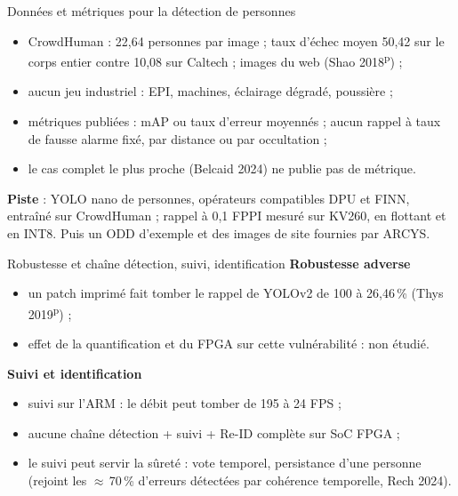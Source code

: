 \documentclass[aspectratio=169,11pt]{beamer}
\newcommand{\pre}{\textsuperscript{\color{acc}p}}
\begin{document}
\begin{frame}{Données et métriques pour la détection de personnes}
  \begin{itemize}
    \item CrowdHuman : 22,64 personnes par image ; taux d'échec moyen 50,42 sur le corps
          entier contre 10,08 sur Caltech ; images du web (Shao 2018\pre) ;
    \item \alert{aucun jeu industriel} : EPI, machines, éclairage dégradé, poussière ;
    \item métriques publiées : mAP ou taux d'erreur moyennés ; aucun rappel à taux de fausse
          alarme fixé, par distance ou par occultation ;
    \item le cas complet le plus proche (Belcaid 2024) ne publie pas de métrique.
  \end{itemize}

  \vspace{0.6em}
  \textbf{Piste} : YOLO nano de personnes, opérateurs compatibles DPU et FINN, entraîné sur
  CrowdHuman ; \alert{rappel à 0,1 FPPI} mesuré sur KV260, en flottant et en INT8. Puis un
  ODD d'exemple et des images de site fournies par ARCYS.
\end{frame}

\begin{frame}{Robustesse et chaîne détection, suivi, identification}
  \textbf{Robustesse adverse}
  \begin{itemize}
    \item un patch imprimé fait tomber le rappel de YOLOv2 de 100 à 26,46\,\% (Thys 2019\pre) ;
    \item effet de la quantification et du FPGA sur cette vulnérabilité : non étudié.
  \end{itemize}

  \vspace{0.5em}
  \textbf{Suivi et identification}
  \begin{itemize}
    \item suivi sur l'ARM : le débit peut tomber de 195 à 24 FPS ;
    \item aucune chaîne détection + suivi + Re-ID complète sur SoC FPGA ;
    \item le suivi peut servir la sûreté : vote temporel, persistance d'une personne
          (rejoint les $\approx$\,70\,\% d'erreurs détectées par cohérence temporelle, Rech 2024).
  \end{itemize}
\end{frame}

\end{document}
